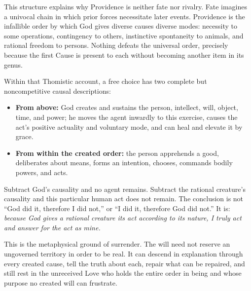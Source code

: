 This structure explains why Providence is neither fate nor rivalry. Fate imagines a univocal chain in which prior forces necessitate later events. Providence is the infallible order by which God gives diverse causes diverse modes: necessity to some operations, contingency to others, instinctive spontaneity to animals, and rational freedom to persons. Nothing defeats the universal order, precisely because the first Cause is present to each without becoming another item in its genus.

Within that Thomistic account, a free choice has two complete but noncompetitive causal descriptions:

\begin{itemize}
\item \textbf{From above:} God creates and sustains the person, intellect, will, object, time, and power; he moves the agent inwardly to this exercise, causes the act's positive actuality and voluntary mode, and can heal and elevate it by grace.
\item \textbf{From within the created order:} the person apprehends a good, deliberates about means, forms an intention, chooses, commands bodily powers, and acts.
\end{itemize}

Subtract God's causality and no agent remains. Subtract the rational creature's causality and this particular human act does not remain. The conclusion is not ``God did it, therefore I did not,'' or ``I did it, therefore God did not.'' It is: \emph{because God gives a rational creature its act according to its nature, I truly act and answer for the act as mine.}

This is the metaphysical ground of surrender. The will need not reserve an ungoverned territory in order to be real. It can descend in explanation through every created cause, tell the truth about each, repair what can be repaired, and still rest in the unreceived Love who holds the entire order in being and whose purpose no created will can frustrate.
